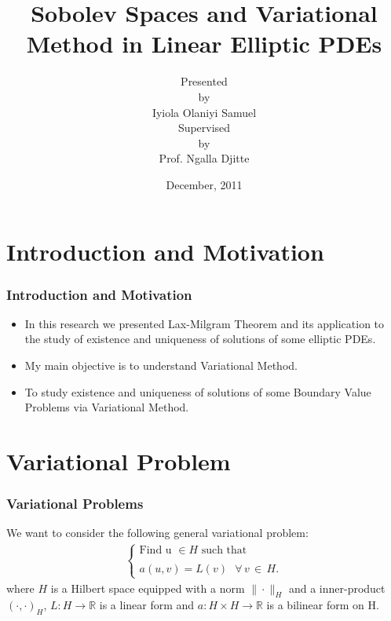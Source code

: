 \documentclass[7pt]{beamer}
\title[Sobolev Spaces and Variational Method in Linear Elliptic Partial Differential Equations]{Sobolev Spaces and Variational Method in Linear Elliptic PDEs}
\author[IYIOLA OLANIYI SAMUEL]{Presented \\ by\\Iyiola Olaniyi Samuel\\Supervised\\by\\Prof. Ngalla Djitte}
\institute[AUST, Abuja, Nigeria]{Pure and Applied Mathematics\\African University of Science and Technology}
\date{December, 2011}
\newcommand{\R}{\mathbb R}
\begin{document}
 \frame{\titlepage}
\section{Introduction and Motivation}
\begin{frame}
\frametitle{Introduction and Motivation}
 \begin{itemize}
\item In this research we presented Lax-Milgram Theorem and its application to the study of existence and uniqueness of solutions of some elliptic PDEs.
\item My main objective is to understand Variational Method.
\item To study existence and uniqueness of solutions of some Boundary Value Problems via Variational Method.
\end{itemize}
\end{frame}
\section{Variational Problem}
\begin{frame}
 \frametitle{Variational Problems}
We want to consider the following general variational problem:
\begin{eqnarray}
\left \{
\begin{array}{lll}
\text{Find u}\,\,\in H\,\, \text{such that}\\
\\
a(u,v) = L(v)\,\,\,\,\forall\,v\,\in\,H.
\end{array}
\right. \label{vp}
\end{eqnarray}
where $H$ is a Hilbert space equipped with a norm $\|\cdot\|_H$
and a inner-product $(\cdot,\cdot)_H$, $L: H\rightarrow \R$ is a
linear form and $a: H\times H\rightarrow \R$ is a bilinear form on H.

\end{frame}
\end{document}
